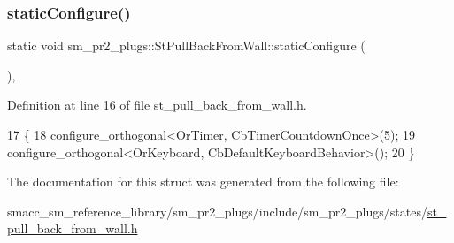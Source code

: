 \subsubsection{\texorpdfstring{static\+Configure()}{staticConfigure()}}
{\footnotesize\ttfamily static void sm\+\_\+pr2\+\_\+plugs\+::\+St\+Pull\+Back\+From\+Wall\+::static\+Configure (\begin{DoxyParamCaption}{ }\end{DoxyParamCaption})\hspace{0.3cm}{\ttfamily [inline]}, {\ttfamily [static]}}



Definition at line 16 of file st\+\_\+pull\+\_\+back\+\_\+from\+\_\+wall.\+h.


\begin{DoxyCode}
17     \{
18         configure\_orthogonal<OrTimer,  CbTimerCountdownOnce>(5);    
19         configure\_orthogonal<OrKeyboard, CbDefaultKeyboardBehavior>();
20     \}
\end{DoxyCode}


The documentation for this struct was generated from the following file\+:\begin{DoxyCompactItemize}
\item 
smacc\+\_\+sm\+\_\+reference\+\_\+library/sm\+\_\+pr2\+\_\+plugs/include/sm\+\_\+pr2\+\_\+plugs/states/\hyperlink{st__pull__back__from__wall_8h}{st\+\_\+pull\+\_\+back\+\_\+from\+\_\+wall.\+h}\end{DoxyCompactItemize}
